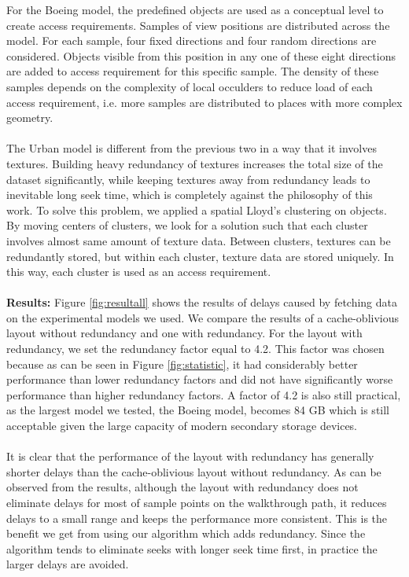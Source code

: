 For the Boeing model, the predefined objects are used as a conceptual level to create access requirements. Samples of view positions are distributed across the model. For each sample, four fixed directions and four random directions are considered. Objects visible from this position in any one of these eight directions are added to access requirement for this specific sample. The density of these samples depends on the complexity of local occulders to reduce load of each access requirement, i.e. more samples are distributed to places with more complex geometry. \\
\\
The Urban model is different from the previous two in a way that it involves textures. Building heavy redundancy of textures increases the total size of the dataset significantly, while keeping textures away from redundancy leads to inevitable long seek time, which is completely against the philosophy of this work. To solve this problem, we applied a spatial Lloyd’s clustering on objects. By moving centers of clusters, we look for a solution such that each cluster involves almost same amount of texture data. Between clusters, textures can be redundantly stored, but within each cluster, texture data are stored uniquely. In this way, each cluster is used as an access requirement.  \\
\\
\textbf{Results:}
Figure \ref{fig:resultall} shows the results of delays caused by fetching data on the experimental models we used. We compare the results of a cache-oblivious layout without redundancy and one with redundancy. For the layout with redundancy, we set the redundancy factor equal to 4.2. This factor was chosen because as can be seen in Figure \ref{fig:statistic}, it had considerably better performance than lower redundancy factors and did not have significantly worse performance than higher redundancy factors. A factor of 4.2 is also still practical, as the largest model we tested, the Boeing model, becomes 84 GB which is still acceptable given the large capacity of modern secondary storage devices.\\
\\
It is clear that the performance of the layout with redundancy has generally shorter delays than the cache-oblivious layout without redundancy. As can be observed from the results, although the layout with redundancy does not eliminate delays for most of sample points on the walkthrough path, it reduces delays to a small range and keeps the performance more consistent. This is the benefit we get from using our algorithm which adds redundancy. Since the algorithm tends to eliminate seeks with longer seek time first, in practice the larger delays are avoided.
